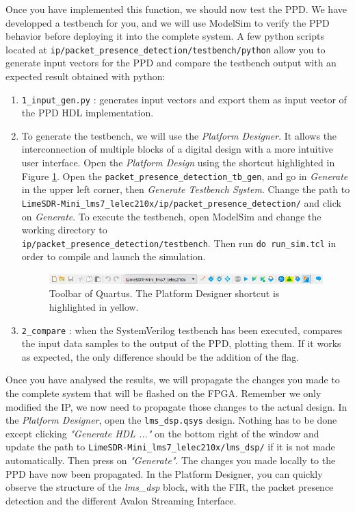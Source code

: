 Once you have implemented this function, we should now test the PPD. We have developped a testbench for you, and we will use ModelSim to verify the PPD behavior before deploying it into the complete system. A few python scripts located at \texttt{ip/packet\_presence\_detection/testbench/python} allow you to generate input vectors for the PPD and compare the testbench output with an expected result obtained with python:

\begin{enumerate}
    \item \texttt{1\_input\_gen.py} : generates input vectors and export them as input vector of the PPD HDL implementation.

    \item To generate the testbench, we will use the \textit{Platform Designer}. It allows the interconnection of multiple blocks of a digital design with a more intuitive user interface. Open the \textit{Platform Design} using the shortcut highlighted in Figure \ref{fig:quartus_platform_designer}. Open the \texttt{packet\_presence\_detection\_tb\_gen}, and go in \textit{Generate} in the upper left corner, then \textit{Generate Testbench System}. Change the path to \texttt{LimeSDR-Mini\_lms7\_lelec210x/ip/packet\_presence\_detection/} and click on \textit{Generate}. To execute the testbench, open ModelSim and change the working directory to\\ \texttt{ip/packet\_presence\_detection/testbench}. Then run \texttt{do run\_sim.tcl} in order to compile and launch the simulation.

\begin{figure}[H]
    \centering
    \includegraphics[scale=0.7]{figures/quartus_toolbar.PNG}
    \caption{Toolbar of Quartus. The Platform Designer shortcut is highlighted in yellow.}
    \label{fig:quartus_platform_designer}
\end{figure}

    \item \texttt{2\_compare} : when the SystemVerilog testbench has been executed, compares the input data samples to the output of the PPD, plotting them. If it works as expected, the only difference should be the addition of the flag.
\end{enumerate}

Once you have analysed the results, we will propagate the changes you made to the complete system that will be flashed on the FPGA. Remember we only modified the IP, we now need to propagate those changes to the actual design. In the \textit{Platform Designer}, open the \texttt{lms\_dsp.qsys} design. Nothing has to be done except clicking \textit{"Generate HDL ..."} on the bottom right of the window and update the path to
\texttt{LimeSDR-Mini\_lms7\_lelec210x/lms\_dsp/} if it is not made automatically. Then press on \textit{"Generate"}. The changes you made locally to the PPD have now been propagated. In the Platform Designer, you can quickly observe the structure of the \textit{lms\_dsp} block, with the FIR, the packet presence detection and the different Avalon Streaming Interface.

